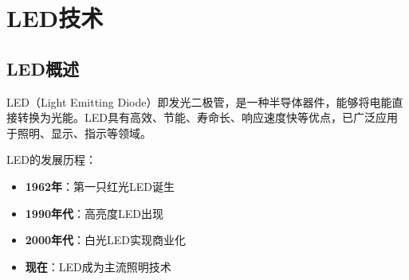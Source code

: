 
\chapter{LED技术}
\label{chap:led_technology}

\section{LED概述}
\label{sec:led_intro}

LED（Light Emitting Diode）即发光二极管，是一种半导体器件，能够将电能直接转换为光能。LED具有高效、节能、寿命长、响应速度快等优点，已广泛应用于照明、显示、指示等领域。

LED的发展历程：
\begin{itemize}
    \item \textbf{1962年}：第一只红光LED诞生
    \item \textbf{1990年代}：高亮度LED出现
    \item \textbf{2000年代}：白光LED实现商业化
    \item \textbf{现在}：LED成为主流照明技术
\end{itemize}

